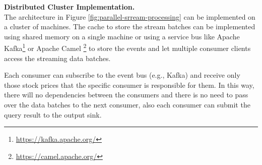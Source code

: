 

        


    
\textbf{Distributed Cluster Implementation.}\\
The architecture in Figure \ref{fig:parallel-srream-processing} can be implemented on a cluster of machines. The cache to store the stream batches can be implemented using shared memory on a single machine or using a service bus like Apache Kafka\footnote{\url{https://kafka.apache.org/}} or Apache Camel \footnote{\url{https://camel.apache.org/}} to store 
the events and let multiple consumer clients access the streaming data batches.  

Each consumer can subscribe to the event bus (e.g., Kafka) and receive only those stock prices that the specific consumer is responsible 
for them. In this way, there will no dependencies between the consumers and there is no need to pass over the data batches to the next 
consumer, also each consumer can submit the query result to the output sink.  

